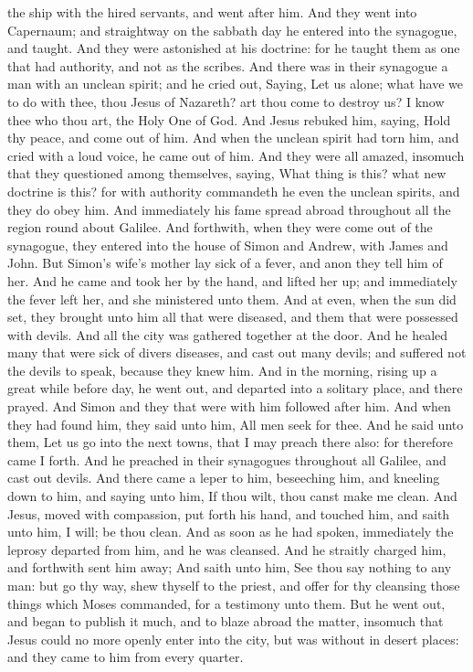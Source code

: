 the ship with the hired servants, and went after him.  And
they went into Capernaum; and straightway on the sabbath day he entered
into the synagogue, and taught.  And they were astonished
at his doctrine: for he taught them as one that had authority, and not
as the scribes.  And there was in their synagogue a man
with an unclean spirit; and he cried out,  Saying, Let us
alone; what have we to do with thee, thou Jesus of Nazareth? art thou
come to destroy us? I know thee who thou art, the Holy One of God.
 And Jesus rebuked him, saying, Hold thy peace, and come
out of him.  And when the unclean spirit had torn him, and
cried with a loud voice, he came out of him.  And they were
all amazed, insomuch that they questioned among themselves, saying, What
thing is this? what new doctrine is this? for with authority commandeth
he even the unclean spirits, and they do obey him.  And
immediately his fame spread abroad throughout all the region round about
Galilee.  And forthwith, when they were come out of the
synagogue, they entered into the house of Simon and Andrew, with James
and John.  But Simon's wife's mother lay sick of a fever,
and anon they tell him of her.  And he came and took her by
the hand, and lifted her up; and immediately the fever left her, and she
ministered unto them.  And at even, when the sun did set,
they brought unto him all that were diseased, and them that were
possessed with devils.  And all the city was gathered
together at the door.  And he healed many that were sick of
divers diseases, and cast out many devils; and suffered not the devils
to speak, because they knew him.  And in the morning,
rising up a great while before day, he went out, and departed into a
solitary place, and there prayed.  And Simon and they that
were with him followed after him.  And when they had found
him, they said unto him, All men seek for thee.  And he
said unto them, Let us go into the next towns, that I may preach there
also: for therefore came I forth.  And he preached in their
synagogues throughout all Galilee, and cast out devils. 
And there came a leper to him, beseeching him, and kneeling down to him,
and saying unto him, If thou wilt, thou canst make me clean.
 And Jesus, moved with compassion, put forth his hand, and
touched him, and saith unto him, I will; be thou clean. 
And as soon as he had spoken, immediately the leprosy departed from him,
and he was cleansed.  And he straitly charged him, and
forthwith sent him away;  And saith unto him, See thou say
nothing to any man: but go thy way, shew thyself to the priest, and
offer for thy cleansing those things which Moses commanded, for a
testimony unto them.  But he went out, and began to publish
it much, and to blaze abroad the matter, insomuch that Jesus could no
more openly enter into the city, but was without in desert places: and
they came to him from every quarter.

